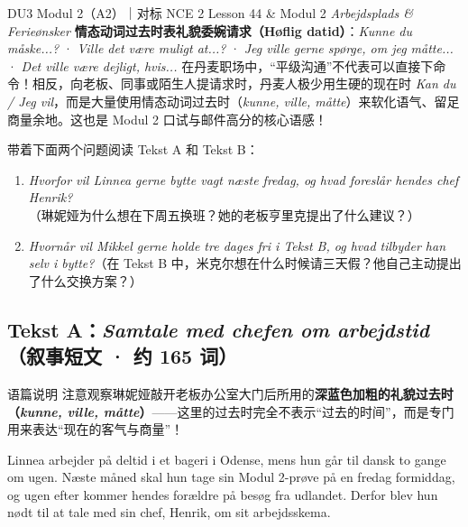 {DU3 Modul 2（A2）｜对标 NCE 2 Lesson 44 \& Modul 2 \textit{Arbejdsplads \& Ferieønsker}}
{\textbf{情态动词过去时表礼貌委婉请求（Høflig datid）}：\textit{Kunne du måske...?} · \textit{Ville det være muligt at...?} · \textit{Jeg ville gerne spørge, om jeg måtte...} · \textit{Det ville være dejligt, hvis...}}
{在丹麦职场中，“平级沟通”不代表可以直接下命令！相反，向老板、同事或陌生人提请求时，丹麦人极少用生硬的现在时 \textit{Kan du / Jeg vil}，而是大量使用情态动词过去时（\textit{kunne, ville, måtte}）来软化语气、留足商量余地。这也是 Modul 2 口试与邮件高分的核心语感！}

\begin{foerduleaeser}
带着下面两个问题阅读 Tekst A 和 Tekst B：
\begin{enumerate}
  \item \textit{Hvorfor vil Linnea gerne bytte vagt næste fredag, og hvad foreslår hendes chef Henrik?}（琳妮娅为什么想在下周五换班？她的老板亨里克提出了什么建议？）
  \item \textit{Hvornår vil Mikkel gerne holde tre dages fri i Tekst B, og hvad tilbyder han selv i bytte?}（在 Tekst B 中，米克尔想在什么时候请三天假？他自己主动提出了什么交换方案？）
\end{enumerate}
\end{foerduleaeser}


\subsection*{Tekst A：\textit{Samtale med chefen om arbejdstid}（叙事短文 · 约 165 词）}

\begin{tipbox}{语篇说明}
注意观察琳妮娅敲开老板办公室大门后所用的\textbf{\color{NCDNavy}深蓝色加粗的礼貌过去时（\textit{kunne, ville, måtte}）}——这里的过去时完全不表示“过去的时间”，而是专门用来表达“现在的客气与商量”！
\end{tipbox}

Linnea arbejder på deltid i et bageri i Odense, mens hun går til dansk to gange om ugen. Næste måned skal hun tage sin Modul 2-prøve på en fredag formiddag, og ugen efter kommer hendes forældre på besøg fra udlandet. Derfor blev hun nødt til at tale med sin chef, Henrik, om sit arbejdsskema.

